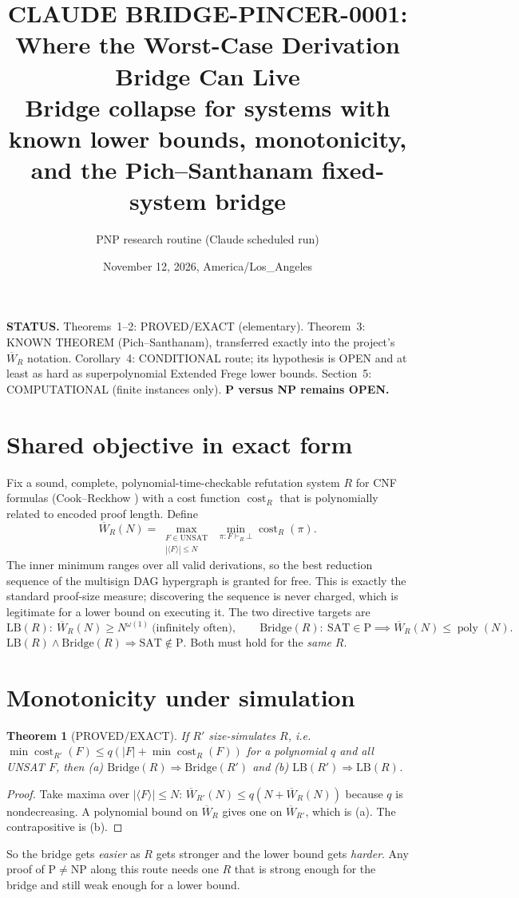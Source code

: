 \documentclass[11pt]{article}
\title{CLAUDE BRIDGE-PINCER-0001: Where the Worst-Case Derivation Bridge Can Live\\
\large Bridge collapse for systems with known lower bounds, monotonicity, and the Pich--Santhanam fixed-system bridge}
\author{PNP research routine (Claude scheduled run)}
\date{November 12, 2026, America/Los\_Angeles}
\newtheorem{theorem}{Theorem}
\theoremstyle{definition}
\newcommand{\Wb}{\overline W}
\begin{document}
\maketitle

\noindent\textbf{STATUS.}
Theorems~1--2: PROVED/EXACT (elementary).
Theorem~3: KNOWN THEOREM (Pich--Santhanam), transferred exactly into the project's $\Wb_R$ notation.
Corollary~4: CONDITIONAL route; its hypothesis is OPEN and at least as hard as superpolynomial Extended Frege lower bounds.
Section~5: COMPUTATIONAL (finite instances only).
\textbf{P versus NP remains OPEN.}

\section*{Shared objective in exact form}
Fix a sound, complete, polynomial-time-checkable refutation system $R$ for CNF formulas (Cook--Reckhow \cite{CR}) with a cost function $\operatorname{cost}_R$ that is polynomially related to encoded proof length. Define
\[
\Wb_R(N)=\max_{\substack{F\in\mathrm{UNSAT}\\ |\langle F\rangle|\le N}}\ \min_{\pi:F\vdash_R\bot}\operatorname{cost}_R(\pi).
\]
The inner minimum ranges over all valid derivations, so the best reduction sequence of the multisign DAG hypergraph is granted for free. This is exactly the standard proof-size measure; discovering the sequence is never charged, which is legitimate for a lower bound on executing it. The two directive targets are
\[
\mathrm{LB}(R):\ \Wb_R(N)\ge N^{\omega(1)}\ \text{(infinitely often)},\qquad
\mathrm{Bridge}(R):\ \mathrm{SAT}\in\mathrm P\implies \Wb_R(N)\le\operatorname{poly}(N).
\]
$\mathrm{LB}(R)\wedge\mathrm{Bridge}(R)\Rightarrow\mathrm{SAT}\notin\mathrm P$. Both must hold for the \emph{same} $R$.

\section{Monotonicity under simulation}
\begin{theorem}[PROVED/EXACT]\label{thm:mono}
If $R'$ size-simulates $R$, i.e.\ $\min\operatorname{cost}_{R'}(F)\le q(|F|+\min\operatorname{cost}_R(F))$ for a polynomial $q$ and all UNSAT $F$, then
(a) $\mathrm{Bridge}(R)\Rightarrow\mathrm{Bridge}(R')$ and (b) $\mathrm{LB}(R')\Rightarrow\mathrm{LB}(R)$.
\end{theorem}
\begin{proof}
Take maxima over $|\langle F\rangle|\le N$: $\Wb_{R'}(N)\le q(N+\Wb_R(N))$ because $q$ is nondecreasing. A polynomial bound on $\Wb_R$ gives one on $\Wb_{R'}$, which is (a). The contrapositive is (b).
\end{proof}
So the bridge gets \emph{easier} as $R$ gets stronger and the lower bound gets \emph{harder}. Any proof of P$\ne$NP along this route needs one $R$ that is strong enough for the bridge and still weak enough for a lower bound.
\end{document}
